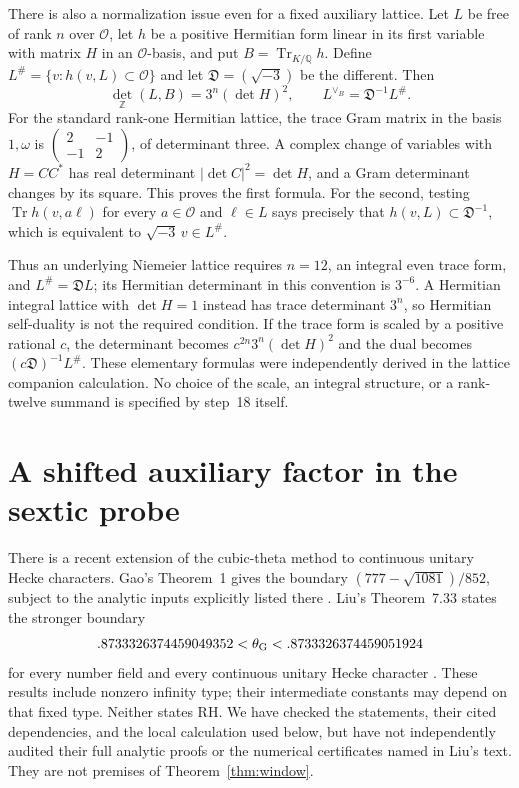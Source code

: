 \documentclass[11pt]{article}
\newcommand{\Q}{\mathbb Q}
\newcommand{\Z}{\mathbb Z}
\newcommand{\Tr}{\operatorname{Tr}}
\theoremstyle{definition}
\theoremstyle{remark}
\begin{document}
There is also a normalization issue even for a fixed auxiliary lattice.
Let $L$ be free of rank $n$ over $\mathcal O$, let $h$ be a positive
Hermitian form linear in its first variable with matrix $H$ in an
$\mathcal O$-basis, and put $B=\Tr_{K/\Q}h$.  Define
$L^\#=\{v:h(v,L)\subset\mathcal O\}$ and let
$\mathfrak D=(\sqrt{-3})$ be the different.  Then
\begin{equation}\label{eq:trace-lattice}
 \det_{\Z}(L,B)=3^n(\det H)^2,\qquad
 L^{\vee_B}=\mathfrak D^{-1}L^\#.
\end{equation}
For the standard rank-one Hermitian lattice, the trace Gram matrix
in the basis $1,\omega$ is
$\left(\begin{smallmatrix}2&-1\\-1&2\end{smallmatrix}\right)$,
of determinant three.  A complex change of variables with
$H=C C^*$ has real determinant $|\det C|^2=\det H$, and a
Gram determinant changes by its square.  This proves the first
formula.  For the second, testing $\Tr h(v,a\ell)$ for every
$a\in\mathcal O$ and $\ell\in L$ says precisely that
$h(v,L)\subset\mathfrak D^{-1}$, which is equivalent to
$\sqrt{-3}\,v\in L^\#$.

Thus an underlying Niemeier lattice requires $n=12$, an integral
even trace form, and $L^\#=\mathfrak D L$; its Hermitian determinant
in this convention is $3^{-6}$.  A Hermitian integral lattice with
$\det H=1$ instead has trace determinant $3^n$, so Hermitian
self-duality is not the required condition.  If the trace form is
scaled by a positive rational $c$, the determinant becomes
$c^{2n}3^n(\det H)^2$ and the dual becomes
$(c\mathfrak D)^{-1}L^\#$.  These elementary formulas were
independently derived in the lattice companion calculation.  No
choice of the scale, an integral structure, or a rank-twelve
summand is specified by step~18 itself.

\section{A shifted auxiliary factor in the sextic probe}

There is a recent extension of the cubic-theta method to continuous
unitary Hecke characters.  Gao's Theorem~1 gives the boundary
$(777-\sqrt{1081})/852$, subject to the analytic inputs explicitly listed
there \cite{Gao}.  Liu's Theorem~7.33 states the stronger boundary
\[
 .8733326374459049352<\theta_{\rm G}<.8733326374459051924
\]
for every number field and every continuous unitary Hecke character
\cite{LiuMixed}.  These results include nonzero infinity type; their
intermediate constants may depend on that fixed type.  Neither states
RH.  We have checked the statements, their cited dependencies, and the
local calculation used below, but have not independently audited their
full analytic proofs or the numerical certificates named in Liu's text.
They are not premises of Theorem~\ref{thm:window}.
\end{document}
